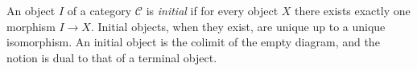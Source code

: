 
An object $I$ of a category $\mathcal C$ is \emph{initial} if for every object $X$ there exists exactly one morphism $I\to X$. Initial objects, when they exist, are unique up to a unique isomorphism. An initial object is the colimit of the empty diagram, and the notion is dual to that of a terminal object.
